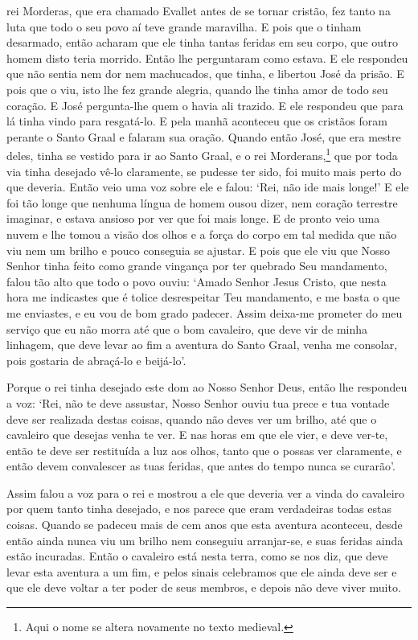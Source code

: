rei Morderas, que era chamado Evallet antes de se tornar cristão, fez tanto na
luta que todo o seu povo aí teve grande maravilha. E pois que o tinham
desarmado, então acharam que ele tinha tantas feridas em seu corpo, que outro
homem disto teria morrido. Então lhe perguntaram como estava. E ele respondeu
que não sentia nem dor nem machucados, que tinha, e libertou José da prisão. E
pois que o viu, isto lhe fez grande alegria, quando lhe tinha amor de todo  seu
coração. E José pergunta-lhe quem o havia ali trazido. E ele respondeu que para
lá tinha vindo para resgatá-lo. E pela manhã aconteceu que os cristãos foram
perante o Santo Graal e falaram sua oração. Quando então José, que era mestre
deles, tinha se vestido para ir ao Santo Graal, e o rei Morderans,\footnote{
Aqui o nome se altera novamente no texto medieval.}  que por toda
via tinha desejado vê-lo claramente, se pudesse ter sido, foi muito mais perto
do que deveria. Então veio uma voz sobre ele e falou: ‘Rei, não ide mais
longe!’ E ele foi tão longe que nenhuma língua de homem ousou dizer, nem
coração terrestre imaginar, e estava ansioso por ver que foi mais longe. E de
pronto veio uma nuvem e lhe tomou a visão dos olhos e a força do corpo em tal
medida que não viu nem um brilho e pouco conseguia se ajustar. E pois que ele
viu que Nosso Senhor tinha feito como grande vingança por ter quebrado Seu
mandamento, falou tão alto que todo o povo ouviu: ‘Amado Senhor Jesus Cristo,
que nesta hora me indicastes que é tolice desrespeitar Teu mandamento, e me
basta o que me enviastes, e eu vou de bom grado padecer. Assim
deixa-me prometer do meu serviço que eu não morra até que o bom cavaleiro, que
deve vir de minha linhagem, que deve levar ao fim a aventura do Santo Graal,
venha me consolar, pois gostaria de abraçá-lo e beijá-lo’. 

Porque o rei tinha desejado este dom ao Nosso Senhor Deus, então lhe
respondeu a voz: ‘Rei, não te deve assustar, Nosso Senhor ouviu tua prece e tua
vontade deve ser realizada destas coisas, quando não deves ver um brilho, até
que o cavaleiro que desejas venha te ver. E nas horas em que ele vier, e deve
ver-te, então te deve ser restituída a luz aos olhos, tanto que o possas ver
claramente, e então devem convalescer as tuas feridas, que antes do tempo nunca
se curarão’. 

Assim falou a voz para o rei e mostrou a ele que deveria ver a vinda do
cavaleiro por quem tanto tinha desejado, e nos parece que eram verdadeiras
todas estas coisas. Quando se padeceu mais de cem anos que esta aventura
aconteceu, desde então ainda nunca viu um brilho nem conseguiu arranjar-se, e
suas feridas ainda estão incuradas. Então o cavaleiro está nesta terra, como se
nos diz, que deve levar esta aventura a um fim, e pelos sinais celebramos que
ele ainda deve ser e que ele deve voltar a ter poder de seus membros, e depois
não deve viver muito. 

